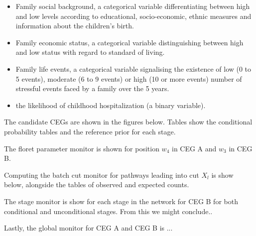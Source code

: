 \documentclass[12pt]{article}
\begin{document}
\begin{itemize}
	\item Family social background, a categorical variable differentiating between high and low levels according to educational, socio-economic, ethnic measures and information about the children’s birth.
	\item Family economic status, a categorical variable distinguishing between high and
	low status with regard to standard of living.
	\item Family life events, a categorical variable signalising the existence of low (0 to 5 events), moderate (6 to 9 events) or high (10 or more events) number of stressful events faced by a family over the 5 years.
	\item the likelihood of childhood hospitalization (a binary variable). 
\end{itemize}


The candidate CEGs are shown in the figures below. Tables show the conditional probability tables and the reference prior for each stage.

The floret parameter monitor is shown for position $w_4$ in CEG A and $w_3$ in CEG B.

Computing the batch cut monitor for pathways leading into cut $X_l$ is show below, alongside the tables of observed and expected counts.

The stage monitor is show for each stage in the network for CEG B for both conditional and unconditional stages. From this we might conclude..

Lastly, the global monitor for CEG A and CEG B is ...
 
%
%
%	
%	

%
%
%
% 
%    
%
\end{document}
